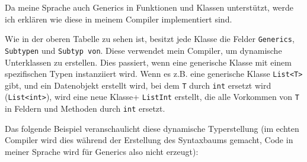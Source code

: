         Da meine Sprache auch Generics in Funktionen und Klassen unterstützt, werde ich erklären wie diese in meinem
        Compiler implementiert sind.


        Wie in der oberen Tabelle zu sehen ist, besitzt jede Klasse die Felder \texttt{Generics}, \texttt{Subtypen} und \texttt{Subtyp von}.
        Diese verwendet mein Compiler, um dynamische Unterklassen zu erstellen. Dies passiert, wenn eine generische Klasse
        mit einem spezifischen Typen instanziiert wird. Wenn es z.B. eine generische Klasse \texttt{List<T>} gibt,
        und ein Datenobjekt erstellt wird, bei dem \texttt{T} durch \texttt{int} ersetzt wird (\texttt{List<int>}), wird eine neue Klasse+
        \texttt{ListInt} erstellt, die alle Vorkommen von \texttt{T} in Feldern und Methoden durch \texttt{int} ersetzt.

        Das folgende Beispiel veranschaulicht diese dynamische Typerstellung (im echten Compiler wird dies während der 
        Erstellung des Syntaxbaums gemacht, Code in meiner Sprache wird für Generics also nicht erzeugt):

